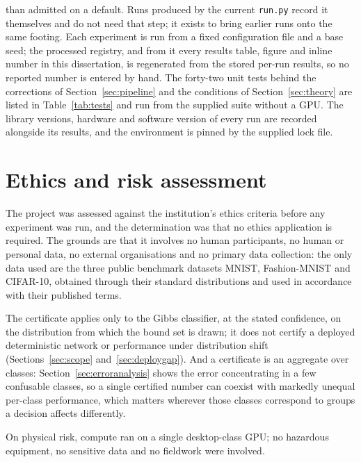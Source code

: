 \begin{uomappendix}
    than admitted on a default. Runs produced by the current
    \texttt{run.py} record it themselves and do not need that step; it exists to
    bring earlier runs onto the same footing.
    Each experiment is run from a fixed configuration file and a base seed;
    the processed registry, and from it every results table, figure and inline
    number in this dissertation, is regenerated from the stored per-run results,
    so no reported number is entered by hand. The forty-two unit tests behind the
    corrections of Section~\ref{sec:pipeline} and the conditions of
    Section~\ref{sec:theory} are listed in Table~\ref{tab:tests} and run from the
    supplied suite without a GPU. The library versions, hardware
    and software version of every run are recorded alongside its results, and the
    environment is pinned by the supplied lock file.

    \section{Ethics and risk assessment}\label{app:risk}
    The project was assessed against the institution's ethics criteria before any
    experiment was run, and the determination was that no ethics application is
    required. The grounds are that it involves no human participants, no human or
    personal data, no external organisations and no primary data collection:
    the only data used are the three public benchmark datasets MNIST,
    Fashion-MNIST and CIFAR-10, obtained through their standard distributions and
    used in accordance with their published terms.

    The certificate applies only to the Gibbs classifier, at the stated
    confidence, on the distribution from which the bound set is drawn; it does not
    certify a deployed deterministic network or performance under distribution
    shift (Sections~\ref{sec:scope} and~\ref{sec:deploygap}). And a certificate is an
    aggregate over classes: Section~\ref{sec:erroranalysis} shows the error
    concentrating in a few confusable classes, so a single certified number can
    coexist with markedly unequal per-class performance, which matters wherever
    those classes correspond to groups a decision affects differently.

    On physical risk, compute ran on a single desktop-class GPU; no hazardous
    equipment, no sensitive data and no fieldwork were involved.
\end{uomappendix}


